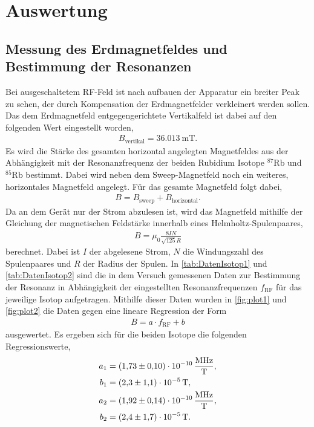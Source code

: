 \section{Auswertung}
\label{sec:Auswertung}

\subsection{Messung des Erdmagnetfeldes und Bestimmung der Resonanzen}
\label{subsec:Erdmagnetfeld}

Bei ausgeschaltetem RF-Feld ist nach aufbauen der Apparatur ein breiter Peak zu sehen, der durch Kompensation der Erdmagnetfelder verkleinert werden sollen.
Das dem Erdmagnetfeld entgegengerichtete Vertikalfeld ist dabei auf den folgenden Wert eingestellt worden,
\begin{align*}
    B_{\text{vertikal}} = \SI{36.013}{\milli\tesla}.
\end{align*}
Es wird die Stärke des gesamten horizontal angelegten Magnetfeldes aus der Abhängigkeit mit der Resonanzfrequenz der beiden Rubidium Isotope $^{87}\text{Rb}$ und $^{85}\text{Rb}$
bestimmt. Dabei wird neben dem Sweep-Magnetfeld noch ein weiteres, horizontales Magnetfeld angelegt. Für das gesamte Magnetfeld folgt dabei,
\begin{align}
    B=B_{\text{sweep}} + B_{\text{horizontal}}.
\end{align}
Da an dem Gerät nur der Strom abzulesen ist, wird das Magnetfeld mithilfe der Gleichung der magnetischen Feldstärke innerhalb eines Helmholtz-Spulenpaares,
\begin{align}
    B=\mu_0\frac{8IN}{\sqrt{125}R}
\end{align}
berechnet. Dabei ist $I$ der abgelesene Strom, $N$ die Windungszahl des Spulenpaares und $R$ der Radius der Spulen.
In \autoref{tab:DatenIsotop1} und \autoref{tab:DatenIsotop2} sind die in dem Versuch gemessenen Daten zur Bestimmung der Resonanz in Abhängigkeit der eingestellten Resonanzfrequenzen
$f_{\text{RF}}$ für das jeweilige Isotop aufgetragen. Mithilfe dieser Daten wurden in \autoref{fig:plot1} und \autoref{fig:plot2} die Daten gegen eine lineare Regression der Form
\begin{align}
    B=a\cdot f_{\text{RF}} + b
\end{align}
ausgewertet. Es ergeben sich für die beiden Isotope die folgenden Regressionswerte,
\begin{align*}
    a_1 &= \SI{1.73 \pm 0.10 e-10}{\mega\hertz\per\tesla}, \\
    b_1 &= \SI{2.3 \pm 1.1 e-5}{\tesla}, \\
    a_2 &= \SI{1.92 \pm 0.14 e-10}{\mega\hertz\per\tesla}, \\
    b_2 &= \SI{2.4 \pm 1.7 e-5}{\tesla}.
\end{align*}

